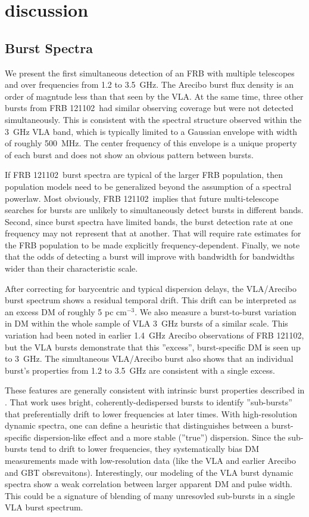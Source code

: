 \documentclass[twocolumn]{aastex61}
\newcommand{\frb}{FRB 121102}
\begin{document}
\section{discussion}
\label{sec:disc}
\subsection{Burst Spectra}

We present the first simultaneous detection of an FRB with multiple telescopes and over frequencies from 1.2 to 3.5~GHz. The Arecibo burst flux density is an order of magntude less than that seen by the VLA. At the same time, three other bursts from \frb\ had similar observing coverage but were not detected simultaneously. This is consistent with the spectral structure observed within the 3~GHz VLA band, which is typically limited to a Gaussian envelope with width of roughly 500~MHz. The center frequency of this envelope is a unique property of each burst and does not show an obvious pattern between bursts.

If \frb\ burst spectra are typical of the larger FRB population, then population models need to be generalized beyond the assumption of a spectral powerlaw. Most obviously, \frb\ implies that future multi-telescope searches for bursts are unlikely to simultaneously detect bursts in different bands. Second, since burst spectra have limited bands, the burst detection rate at one frequency may not represent that at another. That will require rate estimates for the FRB population to be made explicitly frequency-dependent. Finally, we note that the odds of detecting a burst will improve with bandwidth for bandwidths wider than their characteristic scale.

After correcting for barycentric and typical dispersion delays, the VLA/Arecibo burst spectrum shows a residual temporal drift. This drift can be interpreted as an excess DM of roughly 5 pc cm$^{-3}$. We also measure a burst-to-burst variation in DM within the whole sample of VLA 3~GHz bursts of a similar scale. This variation had been noted in earlier 1.4~GHz Arecibo observations of \frb \citep{2016arXiv160308880S}, but the VLA bursts demonstrate that this ''excess'', burst-specific DM is seen up to 3~GHz. The simultaneous VLA/Arecibo burst also shows that an individual burst's properties from 1.2 to 3.5~GHz are consistent with a single excess. 

These features are generally consistent with intrinsic burst properties described in \citet{WEIRD}. That work uses bright, coherently-dedispersed bursts to identify ''sub-bursts'' that preferentially drift to lower frequencies at later times. With high-resolution dynamic spectra, one can define a heuristic that distinguishes between a burst-specific dispersion-like effect and a more stable (''true'') dispersion. Since the sub-bursts tend to drift to lower frequencies, they systematically bias DM measurements made with low-resolution data (like the VLA and earlier Arecibo and GBT obsrevaitons). Interestingly, our modeling of the VLA burst dynamic spectra show a weak correlation between larger apparent DM and pulse width. This could be a signature of blending of many unresovled sub-bursts in a single VLA burst spectrum.
\end{document}
